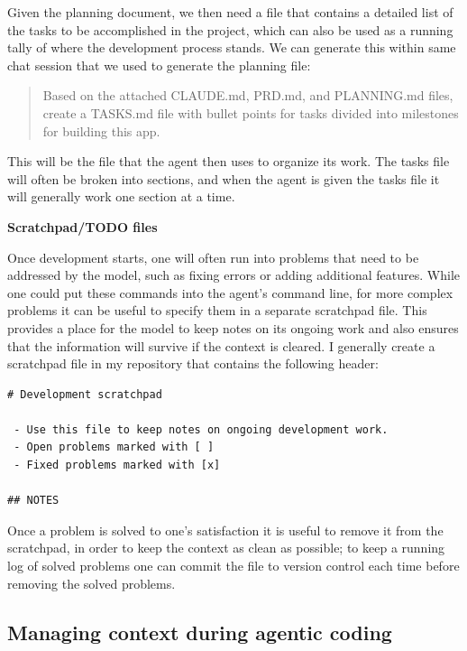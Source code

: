 Given the planning document, we then need a file that contains a detailed list of the tasks to be accomplished in the project, which can also be used as a running tally of where the development process stands.
We can generate this within same chat session that we used to generate the planning file:

\begin{quote}
Based on the attached CLAUDE.md, PRD.md, and PLANNING.md files, create a TASKS.md file with bullet points for tasks divided into milestones for building this app.
\end{quote}

This will be the file that the agent then uses to organize its work. The tasks file will often be broken into sections, and when the agent is given the tasks file it will generally work one section at a time.

\textbf{Scratchpad/TODO files}

Once development starts, one will often run into problems that need to be addressed by the model, such as fixing errors or adding additional features.  While one could put these commands into the agent's command line, for more complex problems it can be useful to specify them in a separate scratchpad file.  This provides a place for the model to keep notes on its ongoing work and also ensures that the information will survive if the context is cleared.  I generally create a scratchpad file in my repository that contains the following header:

\begin{lstlisting}
# Development scratchpad

 - Use this file to keep notes on ongoing development work.
 - Open problems marked with [ ]
 - Fixed problems marked with [x]

## NOTES
\end{lstlisting}

Once a problem is solved to one's satisfaction it is useful to remove it from the scratchpad, in order to keep the context as clean as possible; to keep a running log of solved problems one can commit the file to version control each time before removing the solved problems.

\subsection{Managing context during agentic coding}

